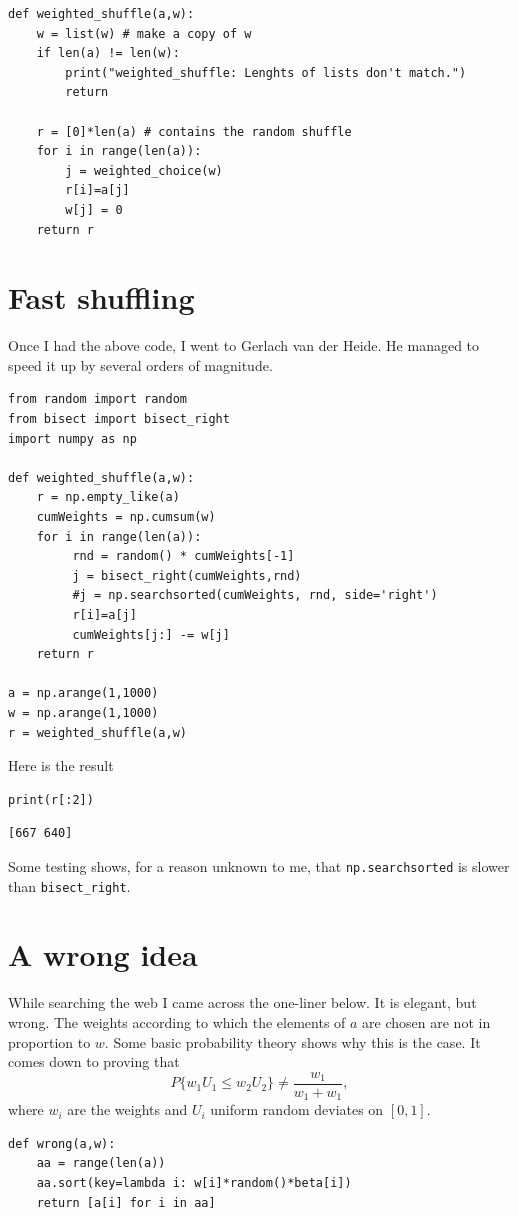 \documentclass[a4paper]{article}
\begin{document}
\begin{verbatim}
def weighted_shuffle(a,w):
    w = list(w) # make a copy of w
    if len(a) != len(w):
        print("weighted_shuffle: Lenghts of lists don't match.")
        return

    r = [0]*len(a) # contains the random shuffle
    for i in range(len(a)):
        j = weighted_choice(w)
        r[i]=a[j]
        w[j] = 0
    return r
\end{verbatim}

\section{Fast shuffling}
\label{sec:orgbd9a9ff}

Once I had the above code, I went to Gerlach van der Heide. He managed
to speed it up by several orders of magnitude.

\begin{verbatim}
from random import random
from bisect import bisect_right
import numpy as np

def weighted_shuffle(a,w):
    r = np.empty_like(a)
    cumWeights = np.cumsum(w)
    for i in range(len(a)):
         rnd = random() * cumWeights[-1]
         j = bisect_right(cumWeights,rnd)
         #j = np.searchsorted(cumWeights, rnd, side='right')
         r[i]=a[j]
         cumWeights[j:] -= w[j]
    return r

a = np.arange(1,1000)
w = np.arange(1,1000)
r = weighted_shuffle(a,w)
\end{verbatim}

Here is the result

\begin{verbatim}
print(r[:2])
\end{verbatim}

\begin{verbatim}
[667 640]
\end{verbatim}


Some testing shows, for a reason unknown to me, that \texttt{np.searchsorted} is slower than \texttt{bisect\_right}.

\section{A wrong idea}
\label{sec:org5cfc74d}

While searching the web I came across the one-liner below. It is
elegant, but wrong. The weights according to which the elements of \(a\)
are chosen are not in proportion to \(w\). Some basic probability theory
shows why this is the case. It comes down to proving that
$$P\{w_1 U_1 \leq w_2 U_2\} \neq \frac{w_1}{w_1+w_1},$$
where \(w_i\) are the weights and \(U_i\) uniform random deviates on
\([0,1]\).

\begin{verbatim}
def wrong(a,w):
    aa = range(len(a))
    aa.sort(key=lambda i: w[i]*random()*beta[i])
    return [a[i] for i in aa]
\end{verbatim}
\end{document}
